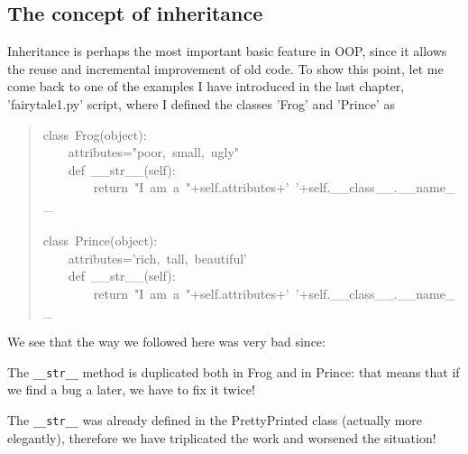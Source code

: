 \documentclass[10pt,english]{article}
\begin{document}
\hypertarget{the-concept-of-inheritance}{}
\subsection*{The concept of inheritance}

Inheritance is perhaps the most important basic feature in OOP, since it
allows the reuse and incremental improvement of old code.
To show this point, let me come back to one of the 
examples I have introduced in the last chapter, 'fairytale1.py' script, 
where I defined the classes 'Frog' and 'Prince' as
\begin{quote}
\begin{ttfamily}\begin{flushleft}
\mbox{class~Frog(object):}\\
\mbox{~~~~attributes="poor,~small,~ugly"}\\
\mbox{~~~~def~{\_}{\_}str{\_}{\_}(self):}\\
\mbox{~~~~~~~~return~"I~am~a~"+self.attributes+'~'+self.{\_}{\_}class{\_}{\_}.{\_}{\_}name{\_}{\_}}\\
\mbox{}\\
\mbox{class~Prince(object):}\\
\mbox{~~~~attributes='rich,~tall,~beautiful'}\\
\mbox{~~~~def~{\_}{\_}str{\_}{\_}(self):}\\
\mbox{~~~~~~~~return~"I~am~a~"+self.attributes+'~'+self.{\_}{\_}class{\_}{\_}.{\_}{\_}name{\_}{\_}}
\end{flushleft}\end{ttfamily}
\end{quote}

We see that the way we followed here was very bad since:
\begin{list}{.}
{
\setlength{\rightmargin}{\leftmargin}
}
\item {} 
The \texttt{{\_}{\_}str{\_}{\_}} method is duplicated both in Frog and in Prince: that
means that if we find a bug a later, we have to fix it twice!

\item {} 
The \texttt{{\_}{\_}str{\_}{\_}} was already defined in the PrettyPrinted class (actually 
more elegantly), therefore we have triplicated the work and worsened the 
situation!

\end{list}
\end{document}
